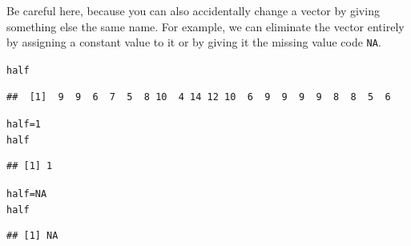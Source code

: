 \documentclass[12pt]{article}\usepackage[]{graphicx}\usepackage[]{color}
\makeatletter
\newcommand{\hlnum}[1]{\textcolor[rgb]{0.686,0.059,0.569}{#1}}%
\newcommand{\hlstd}[1]{\textcolor[rgb]{0.345,0.345,0.345}{#1}}%
\newcommand{\hlkwb}[1]{\textcolor[rgb]{0.69,0.353,0.396}{#1}}%
\newenvironment{kframe}{%
 \def\at@end@of@kframe{}%
 \ifinner\ifhmode%
  \def\at@end@of@kframe{\end{minipage}}%
  \begin{minipage}{\columnwidth}%
 \fi\fi%
 \def\FrameCommand##1{\hskip\@totalleftmargin \hskip-\fboxsep
 \colorbox{shadecolor}{##1}\hskip-\fboxsep
     \hskip-\linewidth \hskip-\@totalleftmargin \hskip\columnwidth}%
 \MakeFramed {\advance\hsize-\width
   \@totalleftmargin\z@ \linewidth\hsize
   \@setminipage}}%
 {\par\unskip\endMakeFramed%
 \at@end@of@kframe}
\newenvironment{knitrout}{}{} %
\makeatother
\begin{document}
Be careful here, because you can also accidentally change a vector by giving something else the same name. For example, we can eliminate the vector entirely by assigning a constant value to it or by giving it the missing value code \verb|NA|.
\begin{knitrout}
\color{fgcolor}\begin{kframe}
\begin{alltt}
\hlstd{half}
\end{alltt}
\begin{verbatim}
##  [1]  9  9  6  7  5  8 10  4 14 12 10  6  9  9  9  9  8  8  5  6
\end{verbatim}
\begin{alltt}
\hlstd{half} \hlkwb{=} \hlnum{1}
\hlstd{half}
\end{alltt}
\begin{verbatim}
## [1] 1
\end{verbatim}
\begin{alltt}
\hlstd{half} \hlkwb{=} \hlnum{NA}
\hlstd{half}
\end{alltt}
\begin{verbatim}
## [1] NA
\end{verbatim}
\end{kframe}
\end{knitrout}
\end{document}
